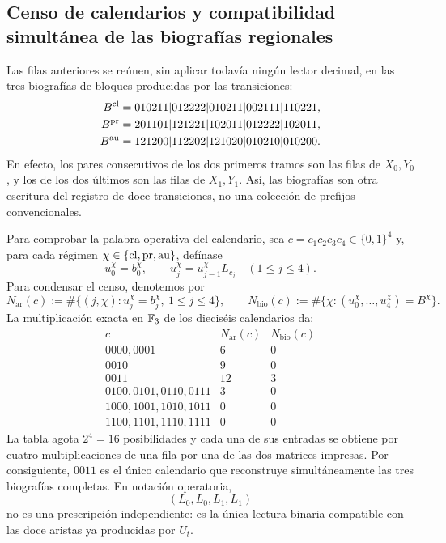 \subsection{Censo de calendarios y compatibilidad simultánea de las biografías regionales}
Las filas anteriores se reúnen, sin aplicar todavía ningún lector decimal,
en las tres biografías de bloques producidas por las transiciones:
\begin{align}
 B^{\rm cl}
  &=010211|012222|010211|002111|110221,\notag\\
 B^{\rm pr}
  &=201101|121221|102011|012222|102011,
 \label{act21:eq:biografias-tpk-tres-caracteres}\\
 B^{\rm au}
  &=121200|112202|121020|010210|010200.\notag
\end{align}
En efecto, los pares consecutivos de los dos primeros tramos son las filas
de \(X_0,Y_0\), y los de los dos últimos son las filas de \(X_1,Y_1\).
Así, las biografías son otra escritura del registro de doce transiciones, no
una colección de prefijos convencionales.

Para comprobar la palabra operativa del calendario, sea
\(c=c_1c_2c_3c_4\in\{0,1\}^4\) y, para cada régimen
\(\chi\in\{{\rm cl},{\rm pr},{\rm au}\}\), defínase
\[
 u_0^\chi=b_0^\chi,\qquad
 u_j^\chi=u_{j-1}^\chi L_{c_j}\quad(1\le j\le4).
\]
Para condensar el censo, denotemos por
\[
 N_{\mathrm{ar}}(c):=
 \#\{(j,\chi):u_j^\chi=b_j^\chi,\ 1\le j\le4\},\qquad
 N_{\mathrm{bio}}(c):=
 \#\{\chi:(u_0^\chi,\ldots,u_4^\chi)=B^\chi\}.
\]
La multiplicación exacta en \(\mathbb F_3\) de los dieciséis calendarios da:
\[
\begin{array}{c|c|c}
 c&N_{\mathrm{ar}}(c)&N_{\mathrm{bio}}(c)\\ \hline
0000,0001&6&0\\
0010&9&0\\
0011&12&3\\
0100,0101,0110,0111&3&0\\
1000,1001,1010,1011&0&0\\
1100,1101,1110,1111&0&0
\end{array}
\tag{D}
\label{act21:eq:censo-dieciseis-calendarios}
\]
La tabla agota \(2^4=16\) posibilidades y cada una de sus entradas se obtiene
por cuatro multiplicaciones de una fila por una de las dos matrices impresas.
Por consiguiente, \(0011\) es el único calendario que reconstruye
simultáneamente las tres biografías completas. En notación operatoria,
\begin{equation}
 (L_0,L_0,L_1,L_1)
 \label{act21:eq:calendario-0011-interno}
\end{equation}
no es una prescripción independiente: es la única lectura binaria compatible
con las doce aristas ya producidas por \(U_t\).

